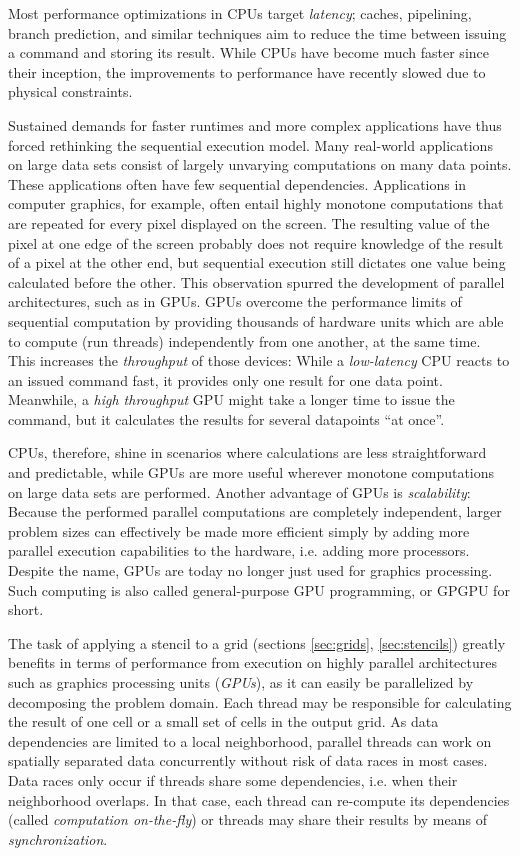 Most performance optimizations in CPUs target \emph{latency}; caches, pipelining, branch prediction, and similar techniques aim to reduce the time between issuing a command and storing its result. While CPUs have become much faster since their inception, the improvements to performance have recently slowed due to physical constraints.

Sustained demands for faster runtimes and more complex applications have thus forced rethinking the sequential execution model. Many real-world applications on large data sets consist of largely unvarying computations on many data points. These applications often have few sequential dependencies. Applications in computer graphics, for example, often entail highly monotone computations that are repeated for every pixel displayed on the screen. The resulting value of the pixel at one edge of the screen probably does not require knowledge of the result of a pixel at the other end, but sequential execution still dictates one value being calculated before the other. This observation spurred the development of parallel architectures, such as in GPUs. GPUs overcome the performance limits of sequential computation by providing thousands of hardware units which are able to compute (run threads) independently from one another, at the same time.\cite[Chapter~2]{cuda-for-engineers} This increases the \emph{throughput} of those devices: While a \emph{low-latency} CPU reacts to an issued command fast, it provides only one result for one data point. Meanwhile, a \emph{high throughput} GPU might take a longer time to issue the command, but it calculates the results for several datapoints ``at once''.

CPUs, therefore, shine in scenarios where calculations are less straightforward and predictable, while GPUs are more useful wherever monotone computations on large data sets are performed. Another advantage of GPUs is \emph{scalability}: Because the performed parallel computations are completely independent, larger problem sizes can effectively be made more efficient simply by adding more parallel execution capabilities to the hardware, i.e. adding more processors. Despite the name, GPUs are today no longer just used for graphics processing. Such computing is also called general-purpose GPU programming, or GPGPU for short.

The task of applying a stencil to a grid (sections \ref{sec:grids}, \ref{sec:stencils}) greatly benefits in terms of performance from execution on highly parallel architectures such as graphics processing units (\emph{GPUs}), as it can easily be parallelized by decomposing the problem domain. Each thread may be responsible for calculating the result of one cell or a small set of cells in the output grid. As data dependencies are limited to a local neighborhood, parallel threads can work on spatially separated data concurrently without risk of data races in most cases. Data races only occur if threads share some dependencies, i.e. when their neighborhood overlaps. In that case, each thread can re-compute its dependencies (called \emph{computation on-the-fly}) or threads may share their results by means of \emph{synchronization}.

